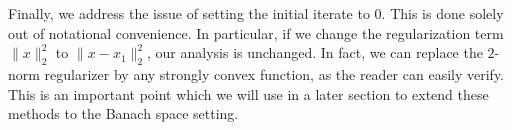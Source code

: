 Finally, we address the issue of setting the initial iterate to $0$. This is done solely out of notational convenience. In particular,
if we change the regularization term $\|x\|_2^2$ to $\|x - x_1\|_2^2$, our analysis is unchanged. In fact, we can replace the 
$2$-norm regularizer by any strongly convex function, as the reader can easily verify. This is an important point which we
will use in a later section to extend these methods to the Banach space setting.
